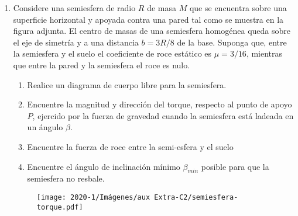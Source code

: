\documentclass[letterpaper,11pt]{article}
\begin{document}
\begin{enumerate}
\newpage
\item Considere una semiesfera de radio $R$ de masa $M$ que se encuentra sobre una superficie horizontal y apoyada contra una pared tal como se muestra en la figura adjunta. El centro de masas de una semiesfera homogénea queda sobre el eje de simetría y a una distancia ${b} = 3 R / 8$ de la base. Suponga que, entre la semiesfera y el suelo el coeficiente de roce estático es $\mu = 3 / 16$, mientras que entre la pared y la semiesfera el roce es nulo.
    \begin{enumerate}
        \item Realice un diagrama de cuerpo libre para la semiesfera.
        \item Encuentre la magnitud y dirección del torque, respecto al punto de apoyo $P$, ejercido por la fuerza de gravedad cuando la semiesfera está ladeada en un ángulo $\beta$.
        \item Encuentre la fuerza de roce entre la semi-esfera y el suelo
        \item Encuentre el ángulo de inclinación mínimo $\beta_{min}$ posible para que la semiesfera no resbale.
    \end{enumerate}
    
    \begin{figure}[H]
        \centering
        \texttt{[image: 2020-1/Imágenes/aux Extra-C2/semiesfera-torque.pdf]}
    \end{figure}


%   

\end{enumerate}
\end{document}
